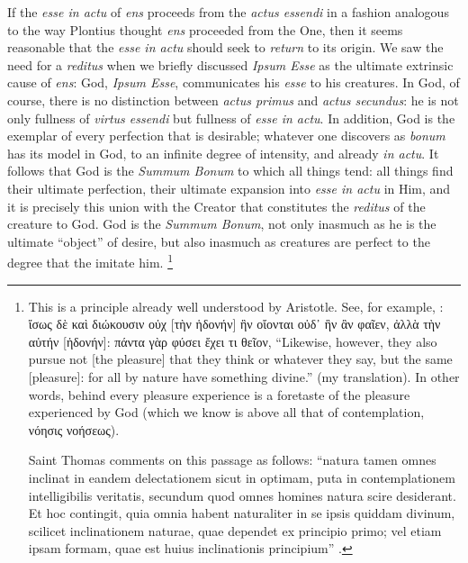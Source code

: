 If the \emph{esse in actu} of \emph{ens} proceeds from the \emph{actus essendi} in a fashion analogous to the way Plontius thought \emph{ens} proceeded from the One, then it seems reasonable that the \emph{esse in actu} should seek to \emph{return} to its origin. We saw the need for a \emph{reditus} when we briefly discussed \emph{Ipsum Esse} as the ultimate extrinsic cause of \emph{ens}: God, \emph{Ipsum Esse}, communicates his \emph{esse} to his creatures. In God, of course, there is no distinction between \emph{actus primus} and \emph{actus secundus}: he is not only fullness of \emph{virtus essendi} but fullness of \emph{esse in actu}. In addition, God is the exemplar of every perfection that is desirable; whatever one discovers as \emph{bonum} has its model in God, to an infinite degree of intensity, and already \emph{in actu}. It follows that God is the \emph{Summum Bonum} to which all things tend: all things find their ultimate perfection, their ultimate expansion into \emph{esse in actu} in Him, and it is precisely this union with the Creator that constitutes the \emph{reditus} of the creature to God. God is the \emph{Summum Bonum}, not only inasmuch as he is the ultimate “object” of desire, but also inasmuch as creatures are perfect to the degree that the imitate him.%
%
\footnote{This is a principle already well understood by Aristotle. See, for example, \cite[Ε, 13, 1153b31–32]{aristotle:ethics}: ἴσως δὲ καὶ διώκουσιν οὐχ [τὴν ἡδονήν] ἣν οἴονται οὐδ᾽ ἣν ἂν φαῖεν, ἀλλὰ τὴν αὐτήν [ἡδονήν]: πάντα γὰρ φύσει ἔχει τι θεῖον, “Likewise, however, they also pursue not [the pleasure] that they think or whatever they say, but the same [pleasure]: for all by nature have something divine.” (my translation). In other words, behind every pleasure experience is a foretaste of the pleasure experienced by God (which we know is above all that of contemplation, νόησις νοήσεως).

Saint Thomas comments on this passage as follows: “natura tamen omnes inclinat in eandem delectationem sicut in optimam, puta in contemplationem intelligibilis veritatis, secundum quod omnes homines natura scire desiderant. Et hoc contingit, quia omnia habent naturaliter in se ipsis quiddam divinum, scilicet inclinationem naturae, quae dependet ex principio primo; vel etiam ipsam formam, quae est huius inclinationis principium” \parencite[lib.~7, l.~1, n. 14]{st:ethics}.}

